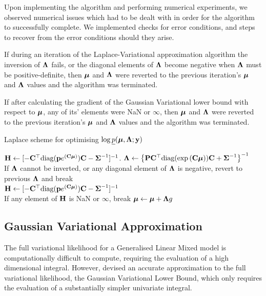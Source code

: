 Upon implementing the algorithm and performing numerical experiments, we observed numerical issues which had to be dealt with in 
order for the algorithm to successfully complete.
We implemented checks for error conditions, and steps to recover from the error conditions should
they arise.

If during an iteration of the Laplace-Variational approximation algorithm the inversion  of ${\boldsymbol \Lambda}$
fails, or the diagonal elements of ${\boldsymbol \Lambda}$ become negative when ${\boldsymbol \Lambda}$ must be positive-definite,
then ${\boldsymbol \mu}$ and ${\boldsymbol \Lambda}$ were reverted to the previous iteration's ${\boldsymbol \mu}$ and ${\boldsymbol \Lambda}$ values and
the algorithm was terminated.

If after calculating the gradient of the Gaussian Variational lower bound with respect to ${\boldsymbol \mu}$, any of
its' elements were NaN or $\infty$, then ${\boldsymbol \mu}$ and ${\boldsymbol \Lambda}$ were reverted to the previous iteration's
${\boldsymbol \mu}$ and ${\boldsymbol \Lambda}$ values and the algorithm was terminated.
		
\begin{algorithm}
	\caption{Laplace scheme for optimising $\log \underline{p}({\boldsymbol \mu}, {\boldsymbol \Lambda}; {\bf y})$}
	\label{alg:laplace_alg}
	\begin{algorithmic}
		\REQUIRE ${\bf H} \leftarrow [- {\bf C}^\top \text{diag}({\bf p} e^{({\bf C} {\boldsymbol \mu})}) {\bf C} - {\boldsymbol \Sigma}^{-1}]^{-1}$.
		\STATE ${\boldsymbol \Lambda} \leftarrow \left \{{\bf P} {\bf C}^\top \text{diag}(\exp{({\bf C}{\boldsymbol\mu})}) {\bf C} + {\boldsymbol \Sigma}^{-1} \right \}^{-1}$ \\ [1ex] 
		If ${\boldsymbol \Lambda}$ cannot be inverted, or any diagonal element of ${\boldsymbol \Lambda}$ is negative, revert to previous
		${\boldsymbol \Lambda}$ and break \\ [1ex]
		\STATE ${\bf H}
		\leftarrow [- {\bf C}^\top \text{diag}({\bf p} e^{({\bf C} {\boldsymbol \mu})}) {\bf C} - {\boldsymbol \Sigma}^{-1}]^{-1}$ \\ [1ex]
		If any element of ${\bf H}$ is NaN or $\infty$,
		break
		\STATE ${\boldsymbol \mu} \leftarrow {\boldsymbol\mu} + {\boldsymbol \Lambda} g$ \\ [1ex]
		\ENDWHILE
	\end{algorithmic}
\end{algorithm}
		
\subsection{Gaussian Variational Approximation}
		
The full variational likelihood for a Generalised Linear Mixed model is computationally difficult to compute,
requiring the evaluation of a high dimensional integral. However, \cite{Ormerod2012} devised an accurate
approximation to the full variational likelihood, the Gaussian Variational Lower Bound, which only requires
the evaluation of a substantially simpler univariate integral.
	
